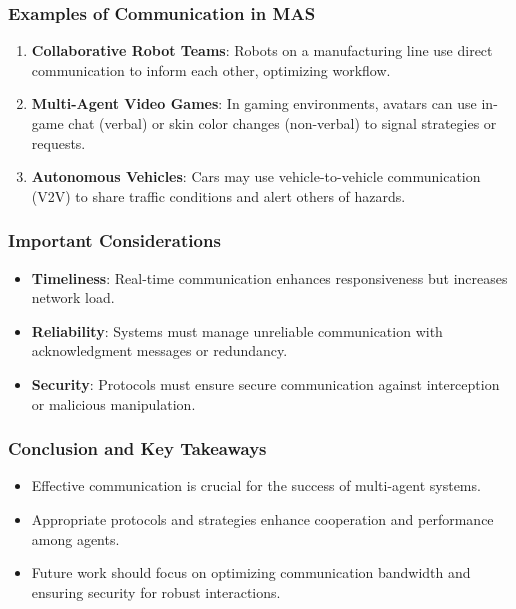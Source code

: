 \documentclass[aspectratio=169]{beamer}
\begin{document}
\begin{frame}[fragile]
    \frametitle{Examples of Communication in MAS}
    \begin{enumerate}
        \item \textbf{Collaborative Robot Teams}:
            Robots on a manufacturing line use direct communication to inform each other, optimizing workflow.
        
        \item \textbf{Multi-Agent Video Games}:
            In gaming environments, avatars can use in-game chat (verbal) or skin color changes (non-verbal) to signal strategies or requests.
        
        \item \textbf{Autonomous Vehicles}:
            Cars may use vehicle-to-vehicle communication (V2V) to share traffic conditions and alert others of hazards.
    \end{enumerate}
\end{frame}

\begin{frame}[fragile]
    \frametitle{Important Considerations}
    \begin{itemize}
        \item \textbf{Timeliness}: Real-time communication enhances responsiveness but increases network load.
        \item \textbf{Reliability}: Systems must manage unreliable communication with acknowledgment messages or redundancy.
        \item \textbf{Security}: Protocols must ensure secure communication against interception or malicious manipulation.
    \end{itemize}
\end{frame}

\begin{frame}[fragile]
    \frametitle{Conclusion and Key Takeaways}
    \begin{itemize}
        \item Effective communication is crucial for the success of multi-agent systems.
        \item Appropriate protocols and strategies enhance cooperation and performance among agents.
        \item Future work should focus on optimizing communication bandwidth and ensuring security for robust interactions.
    \end{itemize}
\end{frame}
\end{document}
